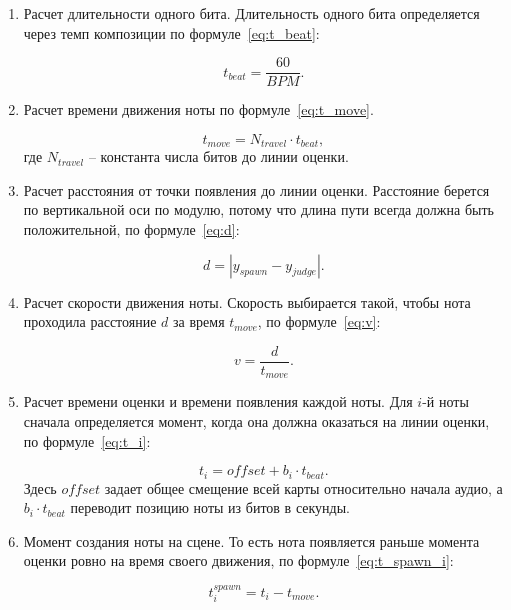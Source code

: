 \documentclass[utf8, russian]{eskdtext}
\numberwithin{equation}{section}
\begin{document}
\begin{enumerate}
    \item Расчет длительности одного бита. Длительность одного бита определяется через темп композиции по формуле~\eqref{eq:t_beat}:
    
    \begin{equation}
    \label{eq:t_beat}
    t_{beat} = \frac{60}{BPM}.
    \end{equation}
    
    \item Расчет времени движения ноты по формуле~\eqref{eq:t_move}.
    
    \begin{equation}
    \label{eq:t_move}
    t_{move} = N_{travel} \cdot t_{beat},
    \end{equation}
    где $N_{travel}$ -- константа числа битов до линии оценки.

    \item Расчет расстояния от точки появления до линии оценки. Расстояние берется по вертикальной оси по модулю, потому что длина пути всегда должна быть положительной, по формуле~\eqref{eq:d}:
    
    \begin{equation}
    \label{eq:d}
    d = \left|y_{spawn} - y_{judge}\right|.
    \end{equation}

    \item Расчет скорости движения ноты. Скорость выбирается такой, чтобы нота проходила расстояние $d$ за время $t_{move}$, по формуле~\eqref{eq:v}:
    
    \begin{equation}
    \label{eq:v}
    v = \frac{d}{t_{move}}.
    \end{equation}

    \item Расчет времени оценки и времени появления каждой ноты. Для $i$-й ноты сначала определяется момент, когда она должна оказаться на линии оценки, по формуле~\eqref{eq:t_i}:
    
    \begin{equation}
    \label{eq:t_i}
    t_i = offset + b_i \cdot t_{beat}.
    \end{equation}
    Здесь $offset$ задает общее смещение всей карты относительно начала аудио, а $b_i \cdot t_{beat}$ переводит позицию ноты из битов в секунды.

    \item Момент создания ноты на сцене. То есть нота появляется раньше момента оценки ровно на время своего движения, по формуле~\eqref{eq:t_spawn_i}:
    
    \begin{equation}
    \label{eq:t_spawn_i}
    t^{spawn}_i = t_i - t_{move}.
    \end{equation}
\end{enumerate}
\end{document}

